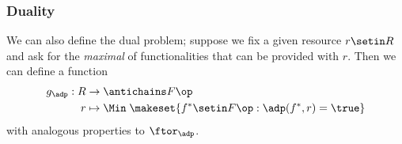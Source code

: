 %
%




\subsubsection{Duality}

We can also define the dual problem; suppose we fix a given resource $r \setin R$ and ask for the \emph{maximal  } of functionalities that can be provided with $r$.
Then we can define a function
\begin{equation}
    \begin{aligned}
        g_\adp : R & \to \antichains F\op \\
        r          & \mapsto \Min \; \makeset{ f^* \setin F\op : \adp(f^*, r) = \true }
    \end{aligned}
\end{equation}
with analogous properties to $\ftor_\adp$.

